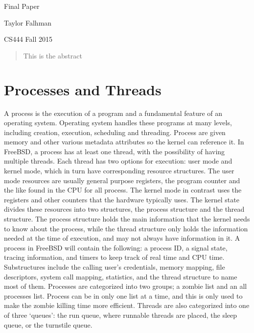 \documentclass[titlepage]{article}
\begin{document}
\begin{titlepage}
\centering
{\Huge Final Paper\par}
{\LARGE Taylor Falhman\par}
{\Large CS444 Fall 2015\par}
\end{titlepage}

\begin{abstract}
\begin{singlespace}
This is the abstract
\end{singlespace}
\end{abstract}

\section{Processes and Threads}
\begin{singlespace}
    A process is the execution of a program and a fundamental feature     of an operating system. Operating system handles these programs at many levels, including creation, execution, scheduling and threading. Process are given memory and other various metadata attributes so the kernel can reference it. 
    In FreeBSD, a process has at least one thread, with the possibility of having multiple threads. Each thread has two options for execution: user mode and kernel mode, which in turn have corresponding resource structures. The user mode resources are usually general purpose registers, the program counter and the like found in the CPU for all process. The kernel mode in contrast uses the registers and other counters that the hardware typically uses. The kernel state divides these resources into two structures, the process structure and the thread structure. The process structure holds the main information that the kernel needs to know about the process, while the thread structure only holds the information needed at the time of execution, and may not always have information in it.
    A process in FreeBSD will contain the following: a process ID, a signal state, tracing information, and timers to keep track of real time and CPU time. Substructures include the calling user’s credentials, memory mapping, file descriptors, system call mapping, statistics, and the thread structure to name most of them. Processes are categorized into two groups; a zombie list and an all processes list. Process can be in only one list at a time, and this is only used to make the zombie killing time more efficient. Threads are also categorized into one of three ‘queues’: the run queue, where runnable threads are placed, the sleep queue, or the turnstile queue. 

\end{singlespace}
\end{document}
